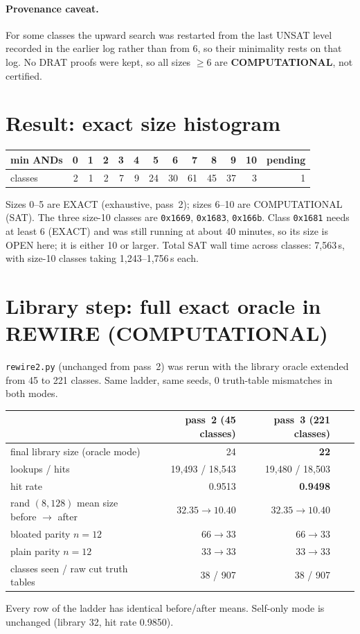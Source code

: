 \documentclass[11pt]{article}
\begin{document}
\paragraph{Provenance caveat.} For some classes the upward search was restarted from the last UNSAT level recorded in the earlier log rather than from 6, so their minimality rests on that log. No DRAT proofs were kept, so all sizes $\ge6$ are \textbf{COMPUTATIONAL}, not certified.

\section{Result: exact size histogram}
\begin{center}\begin{tabular}{lrrrrrrrrrrrr}\toprule
min ANDs & 0&1&2&3&4&5&6&7&8&9&10&pending\\\midrule
classes & 2&1&2&7&9&24&30&61&45&37&3&1\\\bottomrule\end{tabular}\end{center}
Sizes 0--5 are EXACT (exhaustive, pass~2); sizes 6--10 are COMPUTATIONAL (SAT). The three size-10 classes are \texttt{0x1669}, \texttt{0x1683}, \texttt{0x166b}. Class \texttt{0x1681} needs at least 6 (EXACT) and was still running at about 40 minutes, so its size is OPEN here; it is either 10 or larger. Total SAT wall time across classes: 7{,}563\,s, with size-10 classes taking 1{,}243--1{,}756\,s each.

\section{Library step: full exact oracle in REWIRE (COMPUTATIONAL)}
\texttt{rewire2.py} (unchanged from pass~2) was rerun with the library oracle extended from 45 to 221 classes. Same ladder, same seeds, 0 truth-table mismatches in both modes.
\begin{center}\begin{tabular}{lrrrr}\toprule
 & pass~2 (45 classes) & pass~3 (221 classes)\\\midrule
final library size (oracle mode) & 24 & \textbf{22}\\
lookups / hits & 19{,}493 / 18{,}543 & 19{,}480 / 18{,}503\\
hit rate & 0.9513 & \textbf{0.9498}\\
rand $(8,128)$ mean size before $\to$ after & $32.35\to10.40$ & $32.35\to10.40$\\
bloated parity $n=12$ & $66\to33$ & $66\to33$\\
plain parity $n=12$ & $33\to33$ & $33\to33$\\
classes seen / raw cut truth tables & 38 / 907 & 38 / 907\\\bottomrule\end{tabular}\end{center}
Every row of the ladder has identical before/after means. Self-only mode is unchanged (library 32, hit rate 0.9850).
\end{document}

